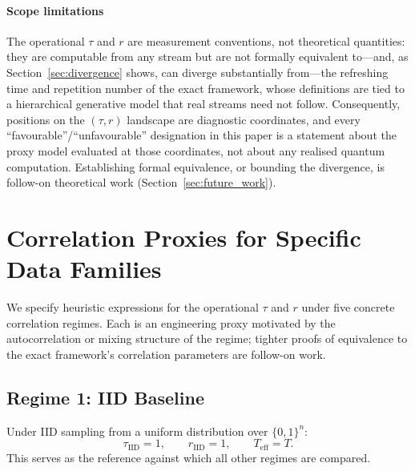 \documentclass[sensors,article,submit,pdftex,moreauthors]{Definitions/mdpi}
\newcommand{\Teff}{T_{\mathrm{eff}}}
\providecommand{\DIFadd}[1]{{\protect\color{blue}#1}} %
\providecommand{\DIFdel}[1]{} %
\providecommand{\DIFaddbegin}{} %
\providecommand{\DIFaddend}{} %
\providecommand{\DIFdelbegin}{} %
\providecommand{\DIFdelend}{} %
\begin{document}
\paragraph{\DIFadd{Scope limitations}} \DIFadd{The operational $\tau$ and $r$ are measurement conventions, not theoretical quantities: they are computable from any stream but are not formally equivalent to---and, as Section~\ref{sec:divergence} shows, can diverge substantially from---the refreshing time and repetition number of }\DIFaddend the \DIFdelbegin \DIFdel{proxy saturates at $0.5$, reflecting that the model predicts no useful signal. This is an engineering surrogate that translates oracle approximation quality into a classification metric for visualization}\DIFdelend \DIFaddbegin \DIFadd{exact framework, whose definitions are tied to a hierarchical generative model that real streams need not follow. Consequently, positions on the $(\tau, r)$ landscape are diagnostic coordinates, and every ``favourable''/``unfavourable'' designation in this paper is a statement about the proxy model evaluated at those coordinates, not about any realised quantum computation. Establishing formal equivalence, or bounding the divergence, is follow-on theoretical work (Section~\ref{sec:future_work})}\DIFaddend .


\section{Correlation Proxies for Specific Data Families}
\label{sec:theory}

We specify heuristic expressions for the operational $\tau$ and $r$ under five concrete correlation regimes. Each is an engineering proxy motivated by the autocorrelation or mixing structure of the regime; tighter proofs of equivalence to the exact framework's correlation parameters are follow-on work.

\subsection{Regime 1: IID Baseline}

Under IID sampling from a uniform distribution over $\{0,1\}^n$:
\begin{equation}
    \tau_{\text{IID}} = 1, \qquad r_{\text{IID}} = 1, \qquad \Teff = T.
\end{equation}
This serves as the reference against which all other regimes are compared.
\end{document}
